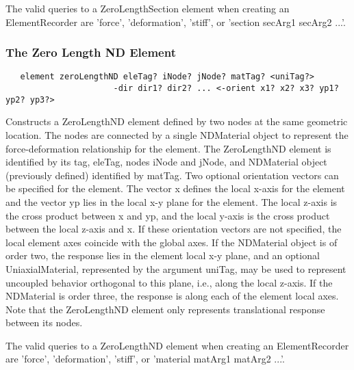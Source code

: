 \documentclass[12pt]{article}
\begin{document}
The valid queries to a ZeroLengthSection element when creating an ElementRecorder
are 'force', 'deformation', 'stiff', or 'section secArg1 secArg2 ...'.

\subsubsection{The Zero Length ND Element}
{\sf\small
\begin{verbatim}
   element zeroLengthND eleTag? iNode? jNode? matTag? <uniTag?>
                      -dir dir1? dir2? ... <-orient x1? x2? x3? yp1? yp2? yp3?>
\end{verbatim}
}

\noindent Constructs a ZeroLengthND element defined by two nodes at the
same geometric location. The nodes are connected by a single
NDMaterial object to represent the force-deformation
relationship for the element.
The ZeroLengthND element is identified
by its tag, eleTag, nodes iNode and jNode, and NDMaterial object
(previously defined) identified by matTag. Two optional orientation vectors can be
specified for the element. The vector x defines the local x-axis for
the element and the vector yp lies in the local x-y plane for the
element. The local z-axis is the cross product between x and yp, and
the local y-axis is the cross product between the local z-axis and x.
If these orientation vectors are not specified, the local element axes
coincide with the global axes.
If the NDMaterial object is of order two, the response lies in the
element local x-y plane, and an optional UniaxialMaterial, represented
by the argument uniTag, may be used
to represent uncoupled behavior orthogonal to this plane, i.e., along the local
z-axis. If the NDMaterial is order three, the response is along
each of the element local axes. Note that the ZeroLengthND element
only represents translational response between its nodes.


The valid queries to a ZeroLengthND element when creating an ElementRecorder
are 'force', 'deformation', 'stiff', or 'material matArg1 matArg2 ...'.


\end{document}

